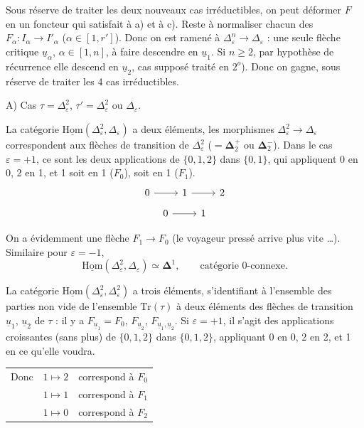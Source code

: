 \documentclass[11pt]{article}
\newcommand{\printedpage}[1]{\marginpar{\footnotesize p.~#1}}
\newcommand{\msp}[1]{\marginpar{\footnotesize [#1]}}
\newcommand{\uHom}{\underline{\mathrm{Hom}}}
\newcommand{\ul}[1]{\underline{#1}}
\begin{document}
Sous réserve de traiter les deux nouveaux cas irréductibles, on peut déformer $F$ en un foncteur qui satisfait à a) et à c). Reste à normaliser chacun des $F_\alpha:I_\alpha\longrightarrow I'_\alpha$ ($\alpha\in[1,r']$). Donc on est ramené à $\Delta^n_\varepsilon\longrightarrow\Delta_\varepsilon$ : une seule flèche critique $\ul{u}_\alpha$, $\alpha\in[1,n]$, à faire descendre en $\ul{u}_1$. Si $n\geq2$, par hypothèse de récurrence elle descend en $\ul{u}_2$, cas supposé traité en $2^o$). Donc
\msp{page 92}
on gagne, sous réserve de traiter les 4 cas irréductibles.

A) Cas $\tau=\Delta^2_\varepsilon$, $\tau'=\Delta^2_\varepsilon$ ou $\Delta_\varepsilon$.

La catégorie $\uHom(\Delta^2_\varepsilon,\Delta_\varepsilon)$ a deux éléments, les morphismes $\Delta^2_\varepsilon\longrightarrow\Delta_\varepsilon$ correspondent aux flèches de transition de $\Delta^2_\varepsilon$ ($=\mathbf{\Delta}^+_2$ ou $\mathbf{\Delta}^-_2$). Dans le cas $\varepsilon=+1$, ce sont les deux applications de $\{0,1,2\}$ dans $\{0,1\}$, qui appliquent 0 en 0, 2 en 1, et 1 soit en 1 ($F_0$), soit en 1 ($F_1$).
\[
\begin{tikzcd}
0 \arrow[r] & 1 \arrow[r] & 2
\end{tikzcd}
\]
\[
\begin{tikzcd}
0 \arrow[r] & 1
\end{tikzcd}
\]

On a évidemment une flèche $F_1\longrightarrow F_0$ (le voyageur pressé arrive plus vite \ldots). Similaire pour $\varepsilon=-1$,
\[
\uHom(\Delta^2_\varepsilon,\Delta_\varepsilon)\simeq\mathbf{\Delta}^1,\qquad\text{catégorie 0-connexe.}
\]

La catégorie $\uHom(\Delta^2_\varepsilon,\Delta^2_\varepsilon)$ a trois éléments, s'identifiant à l'ensemble des parties non vide de l'ensemble $\mathrm{Tr}(\tau)$ à deux éléments des flèches de transition $\ul{u}_1$, $\ul{u}_2$ de $\tau$ : il y a $F_{\ul{u}_1}=F_0$, $F_{\ul{u}_2}$, $F_{\ul{u}_1,\ul{u}_2}$. Si $\varepsilon=+1$, il s'agit des applications croissantes (sans plus) de $\{0,1,2\}$ dans $\{0,1,2\}$, appliquant 0 en 0, 2 en 2, et 1 en ce qu'elle voudra. %

\printedpage{59}

\begin{tabular}{lll}
Donc & $1\longmapsto 2$ & correspond à \quad $F_0$\\[1ex]
 & $1\longmapsto 1$ & correspond à \quad $F_1$\\[1ex]
 & $1\longmapsto 0$ & correspond à \quad $F_2$
\end{tabular}
\end{document}
